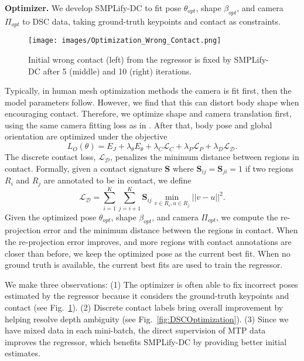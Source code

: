 \documentclass[final]{cvpr}
\newcommand{\smplifyxdc}{\mbox{SMPLify-DC}\xspace}
\theoremstyle{definition}
\begin{document}
\textbf{Optimizer.} We develop \smplifyxdc to fit pose $\theta_{opt}$, shape $\beta_{opt}$, and camera $\Pi_{opt}$ to DSC data, taking ground-truth keypoints and contact as constraints.
\begin{figure}[t]
	\centerline{\texttt{[image: images/Optimization\_Wrong\_Contact.png]}}
	\caption{Initial wrong contact (left) from the regressor is fixed by \smplifyxdc after 5 (middle) and 10 (right) iterations.}
	\label{fig:Optimization_Wrong_Contact}
\end{figure}
Typically, in human mesh optimization methods the camera is fit first, then the model parameters follow. However, we find that this can distort  body shape when encouraging contact. Therefore, we optimize shape and camera translation first, using the same camera fitting loss as in \cite{kolotouros2019learning}. After that, body pose and global orientation are optimized under the objective 
\begin{equation}
L_O(\theta) = E_J + \lambda_{\theta}E_{\theta} + \lambda_{C} \mathcal{L}_{C} + \lambda_{P} \mathcal{L}_{P} + \lambda_{D} \mathcal{L_D} \text{.}
\label{eq:DSCOptimization}
\end{equation}
The discrete contact loss, $\mathcal{L_D}$, penalizes the minimum distance between regions in contact. 
Formally, given a contact signature $\mathbf{S}$ where $\mathbf{S}_{ij} = \mathbf{S}_{ji} = 1$ if two regions $R_i$ and $R_j$ are annotated to be in contact, we define $$\mathcal{L_D} =\sum_{i = 1}^{K} \sum_{j = i+1}^{K} \mathbf{S}_{ij} \min_{v \in R_i, u \in R_j} ||v - u||^2 \text{.}$$ 
Given the optimized pose $\theta_{opt}$, shape $\beta_{opt}$, and camera $\Pi_{opt}$, we compute the re-projection error and the minimum distance between the regions in contact.
When the re-projection error improves, and more regions with contact annotations are closer than before, we keep the optimized pose as the current best fit. 
When no ground truth is available, the current best fits are used to train the regressor. 

We make three observations: (1) The optimizer is often able to fix incorrect poses estimated by the regressor because it considers the ground-truth keypoints and contact (see Fig.~\ref{fig:Optimization_Wrong_Contact}).
(2) Discrete contact labels bring overall improvement by helping resolve depth ambiguity (see Fig.~\ref{fig:DSCOptimization}).
(3) Since we have mixed data in each mini-batch, the direct supervision of MTP data 
improves the regressor, which benefits \smplifyxdc by providing better initial estimates.
\end{document}
